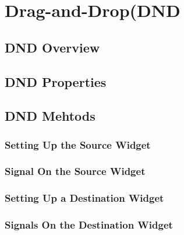 \chapter{Drag-and-Drop(DND}
\section{DND Overview}
\section{DND Properties}
\section{DND Mehtods}
	\subsection{Setting Up the Source Widget}
	\subsection{Signal On the Source Widget}
	\subsection{Setting Up a Destination Widget}
	\subsection{Signals On the Destination Widget}
